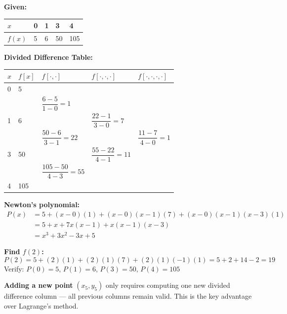 \documentclass[12pt]{article}
\newcommand{\hcell}[1]{\textbf{\color{white}#1}}
\begin{document}
\begin{examplebox*}
\textbf{Given:}
\begin{center}
\begin{tabular}{C{1.4cm} C{1.4cm} C{1.4cm} C{1.4cm} C{1.4cm}}
\toprule
{}
\hcell{$x$} & \hcell{0} & \hcell{1} & \hcell{3} & \hcell{4} \\
\midrule
$f(x)$ & 5 & 6 & 50 & 105 \\
\bottomrule
\end{tabular}
\end{center}

\textbf{Divided Difference Table:}
\begin{center}
\renewcommand{\arraystretch}{1.5}
\begin{tabular}{C{1cm} C{1cm} C{2.2cm} C{2.6cm} C{2.6cm}}
\toprule
{}
\hcell{$x$} & \hcell{$f[x]$} & \hcell{$f[\cdot,\cdot]$} & \hcell{$f[\cdot,\cdot,\cdot]$} & \hcell{$f[\cdot,\cdot,\cdot,\cdot]$} \\
 & 5 & & & \\
 & & $\dfrac{6-5}{1-0}=1$ & & \\
1 & 6 & & $\dfrac{22-1}{3-0}=7$ & \\
 & & $\dfrac{50-6}{3-1}=22$ & & $\dfrac{11-7}{4-0}=1$ \\
3 & 50 & & $\dfrac{55-22}{4-1}=11$ & \\
 & & $\dfrac{105-50}{4-3}=55$ & & \\
4 & 105 & & & \\
\bottomrule
\end{tabular}
\end{center}

\textbf{Newton's polynomial:}
\begin{align*}
  P(x) &= 5 + (x-0)(1) + (x-0)(x-1)(7) + (x-0)(x-1)(x-3)(1) \\
  &= 5 + x + 7x(x-1) + x(x-1)(x-3) \\
  &= x^3 + 3x^2 - 3x + 5
\end{align*}

\textbf{Find $f(2)$:}
\[
  P(2) = 5 + (2)(1) + (2)(1)(7) + (2)(1)(-1)(1) = 5 + 2 + 14 - 2 = \boxed{19}
\]
Verify: $P(0)=5$,\; $P(1)=6$,\; $P(3)=50$,\; $P(4)=105$ \checkmark
\end{examplebox*}

\bigskip

\begin{keybox}
\textbf{Adding a new point} $(x_5, y_5)$ only requires computing one new divided difference column — all previous columns remain valid. This is the key advantage over Lagrange's method.
\end{keybox}
\end{document}
